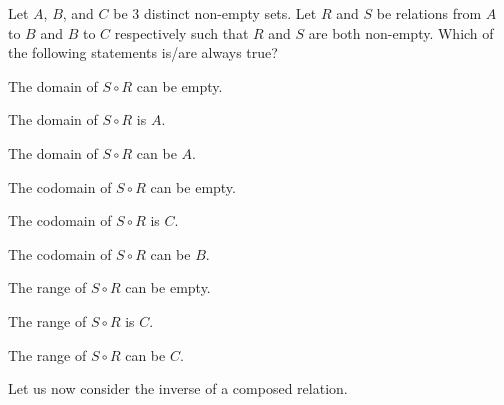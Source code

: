 \begin{exercise}
    Let $A$, $B$, and $C$ be 3 distinct non-empty sets. Let $R$ and $S$ be relations from $A$ to $B$ and $B$ to $C$ respectively such that $R$ and $S$ are both non-empty. Which of the following statements is/are always true?
    \begin{partquestions}{\alph*}
        \item The domain of $S \circ R$ can be empty.
        \item The domain of $S \circ R$ is $A$.
        \item The domain of $S \circ R$ can be $A$.
        \item The codomain of $S \circ R$ can be empty.
        \item The codomain of $S \circ R$ is $C$.
        \item The codomain of $S \circ R$ can be $B$.
        \item The range of $S \circ R$ can be empty.
        \item The range of $S \circ R$ is $C$.
        \item The range of $S \circ R$ can be $C$.
    \end{partquestions}
\end{exercise}

Let us now consider the inverse of a composed relation.

